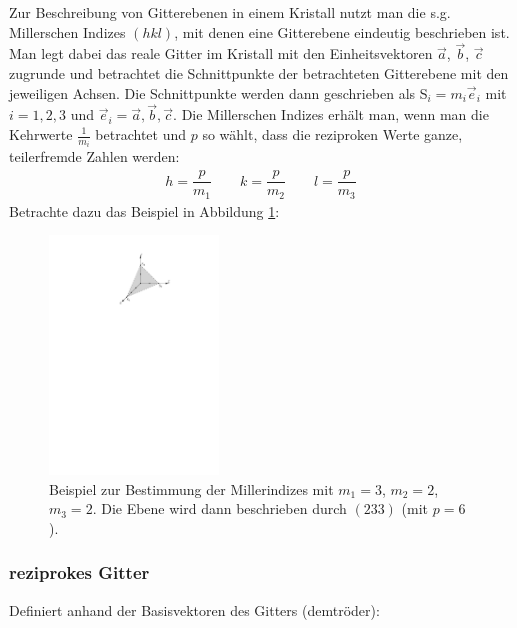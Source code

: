 \documentclass[10pt, a4paper]{article}
\begin{document}
Zur Beschreibung von Gitterebenen in einem Kristall nutzt man die s.g. Millerschen Indizes $(hkl)$, mit denen eine Gitterebene eindeutig beschrieben ist.
Man legt dabei das reale Gitter im Kristall mit den Einheitsvektoren $\vec{a}$, $\vec{b}$, $\vec{c}$ zugrunde und betrachtet die Schnittpunkte der betrachteten Gitterebene mit den jeweiligen Achsen.
Die Schnittpunkte werden dann geschrieben als S$_i=m_i\vec{e}_i$ mit $i=1,2,3$ und $\vec{e}_i= \vec{a}, \vec{b}, \vec{c}$.
Die Millerschen Indizes erhält man, wenn man die Kehrwerte $\frac{1}{m_i}$ betrachtet und $p$ so wählt, dass die reziproken Werte ganze, teilerfremde Zahlen werden\cite{demtroeder}:
\begin{align}
h=\dfrac{p}{m_1} \quad\quad k=\dfrac{p}{m_2} \quad\quad l=\dfrac{p}{m_3}
\end{align}
Betrachte dazu das Beispiel in Abbildung \ref{fig:millerindizes}:
\begin{figure}[h]
\centering
\includegraphics[width=0.4\textwidth]{./grafiken/millerindizes.pdf}
\caption{Beispiel zur Bestimmung der Millerindizes mit $m_1=3$, $m_2=2$, $m_3=2$. Die Ebene wird dann beschrieben durch $(233)$ (mit $p=6$).}
\label{fig:millerindizes}
\end{figure}

\subsubsection{reziprokes Gitter}
Definiert anhand der Basisvektoren des Gitters (demtröder):
\end{document}
